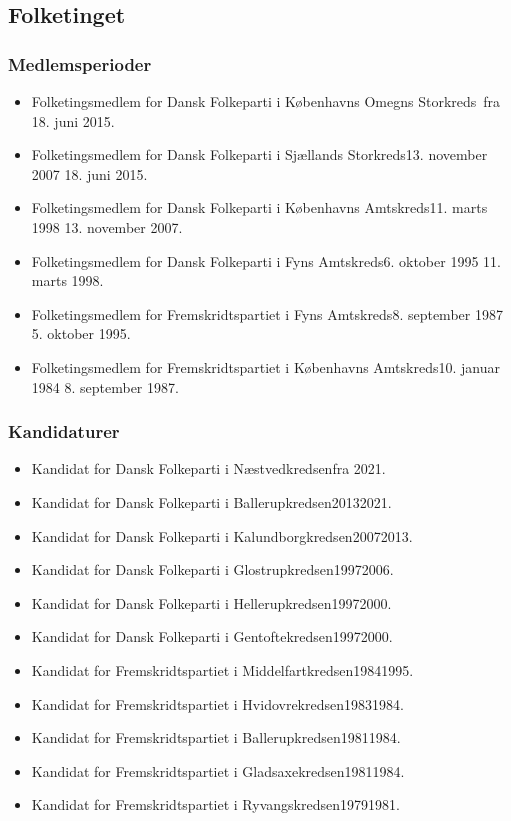 \documentclass[11pt, a4paper]{awesome-cv}
\begin{document}
\begin{cvletter}
\subsection*{Folketinget}
\subsubsection*{Medlemsperioder}
\begin{itemize}
\item Folketingsmedlem for Dansk Folkeparti i Københavns Omegns Storkreds fra 18. juni 2015.
\item Folketingsmedlem for Dansk Folkeparti i Sjællands Storkreds13. november 2007  18. juni 2015.
\item Folketingsmedlem for Dansk Folkeparti i Københavns Amtskreds11. marts 1998  13. november 2007.
\item Folketingsmedlem for Dansk Folkeparti i Fyns Amtskreds6. oktober 1995  11. marts 1998.
\item Folketingsmedlem for Fremskridtspartiet i Fyns Amtskreds8. september 1987  5. oktober 1995.
\item Folketingsmedlem for Fremskridtspartiet i Københavns Amtskreds10. januar 1984  8. september 1987.
\end{itemize}
\subsubsection*{Kandidaturer}
\begin{itemize}
\item Kandidat for Dansk Folkeparti i Næstvedkredsenfra 2021.
\item Kandidat for Dansk Folkeparti i Ballerupkredsen20132021.
\item Kandidat for Dansk Folkeparti i Kalundborgkredsen20072013.
\item Kandidat for Dansk Folkeparti i Glostrupkredsen19972006.
\item Kandidat for Dansk Folkeparti i Hellerupkredsen19972000.
\item Kandidat for Dansk Folkeparti i Gentoftekredsen19972000.
\item Kandidat for Fremskridtspartiet i Middelfartkredsen19841995.
\item Kandidat for Fremskridtspartiet i Hvidovrekredsen19831984.
\item Kandidat for Fremskridtspartiet i Ballerupkredsen19811984.
\item Kandidat for Fremskridtspartiet i Gladsaxekredsen19811984.
\item Kandidat for Fremskridtspartiet i Ryvangskredsen19791981.
\end{itemize}

\end{cvletter}
\end{document}
